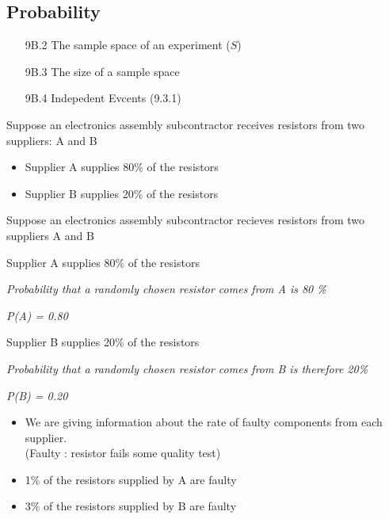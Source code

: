 \documentclass[12pt]{report}
\begin{document}
		\subsection*{Probability}
		\begin{itemize}
			\item[9B.2] The sample space of an experiment ($S$)
			\item[9B.3] The size of a sample space
			\item[9B.4] Indepedent Evcents (9.3.1)
		\end{itemize}
		
		
		\Large
		Suppose an electronics assembly subcontractor receives resistors from two suppliers: A and B
		
		\begin{itemize}
			\item Supplier A supplies 80\% of the resistors
			\vspace{2cm}
			\item Supplier B supplies 20\% of the resistors
			\vspace{2cm}
		\end{itemize}
		
		
		\Large
		Suppose an electronics assembly subcontractor recieves resistors from two suppliers A and B
		
		\begin{itemize}
			\item Supplier A supplies 80\% of the resistors
			{
				\Large
				
				\item \textit{Probability that a randomly chosen resistor comes from A is 80 \%}
				\item \textit{P(A) = 0.80 }
				
			}
			\item Supplier B supplies 20\% of the resistors
			\item \textit{Probability that a randomly chosen resistor comes from B is therefore 20\%}
			\item \textit{P(B) = 0.20}
		\end{itemize}
		
		\Large
		\begin{itemize}
			\item We are giving information about the rate of faulty components from each supplier. \\(Faulty : resistor fails some quality test)
			\vspace{1cm}
			\item 1\% of the resistors supplied by A are faulty
			\vspace{1cm}
			\item 3\% of the resistors supplied by B are faulty 
			\vspace{1cm}
		\end{itemize}
		
\end{document}
